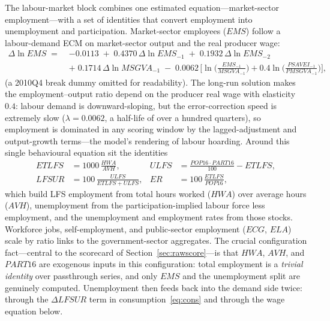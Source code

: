 The labour-market block combines one estimated equation---market-sector employment---with a set of identities that convert employment into unemployment and participation. Market-sector employees ($EMS$) follow a labour-demand ECM on market-sector output and the real producer wage:
\begin{equation}
\begin{aligned}
\Delta \ln EMS \;=\;& -0.0113 \;+\; 0.4370\,\Delta \ln EMS_{-1} \;+\; 0.1932\,\Delta \ln EMS_{-2} \\
&+\; 0.1714\,\Delta \ln MSGVA_{-1} \;-\; 0.0062\,\Big[ \ln\!\big(\tfrac{EMS_{-1}}{MSGVA_{-1}}\big) + 0.4 \ln\!\big(\tfrac{PSAVEI_{-1}}{PMSGVA_{-1}}\big) \Big],
\end{aligned}
\label{eq:ems}
\end{equation}
(a 2010Q4 break dummy omitted for readability). The long-run solution makes the employment--output ratio depend on the producer real wage with elasticity $0.4$: labour demand is downward-sloping, but the error-correction speed is extremely slow ($\lambda = 0.0062$, a half-life of over a hundred quarters), so employment is dominated in any scoring window by the lagged-adjustment and output-growth terms---the model's rendering of labour hoarding. Around this single behavioural equation sit the identities
\begin{align}
ETLFS &= 1000\,\frac{HWA}{AVH}, &
ULFS &= \frac{POP16 \cdot PART16}{100} - ETLFS, \label{eq:etlfs}\\
LFSUR &= 100\,\frac{ULFS}{ETLFS + ULFS}, &
ER &= 100\,\frac{ETLFS}{POP16},
\label{eq:lfsur}
\end{align}
which build LFS employment from total hours worked ($HWA$) over average hours ($AVH$), unemployment from the participation-implied labour force less employment, and the unemployment and employment rates from those stocks. Workforce jobs, self-employment, and public-sector employment ($ECG$, $ELA$) scale by ratio links to the government-sector aggregates. The crucial configuration fact---central to the scorecard of Section~\ref{sec:rawscore}---is that $HWA$, $AVH$, and $PART16$ are exogenous inputs in this configuration: total employment is a \emph{trivial identity} over passthrough series, and only $EMS$ and the unemployment split are genuinely computed. Unemployment then feeds back into the demand side twice: through the $\Delta LFSUR$ term in consumption~\eqref{eq:cons} and through the wage equation below.

